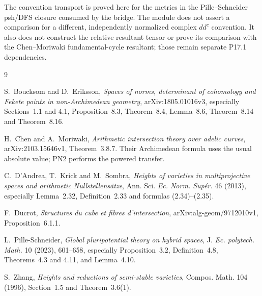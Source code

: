 \documentclass[11pt]{article}
\begin{document}
The convention transport is proved here for the metrics in the
Pille--Schneider psh/DFS closure consumed by the bridge.  The module does not
assert a comparison for a different, independently normalized complex
$dd^c$ convention.  It also does not construct the relative resultant
tensor or prove its comparison with the Chen--Moriwaki fundamental-cycle
resultant; those remain separate P17.1 dependencies.

\begin{thebibliography}{9}
\raggedright
{}
S.~Boucksom and D.~Eriksson,
\emph{Spaces of norms, determinant of cohomology and Fekete points in
non-Archimedean geometry}, arXiv:1805.01016v3, especially Sections~1.1 and
4.1, Proposition~8.3, Theorem~8.4, Lemma~8.6, Theorem~8.14 and
Theorem~8.16.

\smallskip
{}
H.~Chen and A.~Moriwaki,
\emph{Arithmetic intersection theory over adelic curves},
arXiv:2103.15646v1, Theorem~3.8.7.  Their Archimedean formula uses the usual
absolute value; PN2 performs the powered transfer.

\smallskip
{}
C.~D'Andrea, T.~Krick and M.~Sombra,
\emph{Heights of varieties in multiprojective spaces and arithmetic Nullstellens\"atze},
Ann. Sci. \emph{Ec. Norm. Sup\'er.} 46 (2013), especially Lemma~2.32,
Definition~2.33 and formulas (2.34)--(2.35).

\smallskip
{}
F.~Ducrot,
\emph{Structures du cube et fibres d'intersection},
arXiv:alg-geom/9712010v1, Proposition~6.1.1.

\smallskip
{}
L.~Pille-Schneider,
\emph{Global pluripotential theory on hybrid spaces},
J. \emph{Ec. polytech. Math.} 10 (2023), 601--658, especially
Proposition~3.2, Definition~4.8, Theorems~4.3 and 4.11, and Lemma~4.10.

\smallskip
{}
S.~Zhang,
\emph{Heights and reductions of semi-stable varieties},
Compos. Math. 104 (1996), Section~1.5 and Theorem~3.6(1).
\end{thebibliography}
\end{document}
